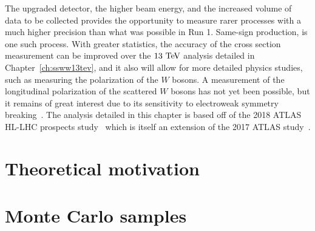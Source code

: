 The upgraded detector, the higher beam energy, and the increased volume of data to be collected provides the opportunity to measure rarer processes with a much higher precision than what was possible in Run 1.
Same-sign \ssww production, is one such process.
With greater statistics, the accuracy of the cross section measurement can be improved over the $13\tev$ analysis detailed in Chapter~\ref{ch:ssww13tev}, and it also will allow for more detailed physics studies, such as measuring the polarization of the $W$ bosons.
A measurement of the longitudinal polarization of the scattered $W$ bosons has not yet been possible, but it remains of great interest due to its sensitivity to electroweak symmetry breaking~\cite{2013.longitudinal-theory}. %
The analysis detailed in this chapter is based off of the 2018 ATLAS HL-LHC \ssww prospects study~\cite{2018.ssww-upgrade} which is itself an extension of the 2017 ATLAS study~\cite{2017.ssww-upgrade}.  




%

\section{Theoretical motivation}\label{sswwupgrade:theory}


\section{Monte Carlo samples}\label{sswwupgrade:mc}


